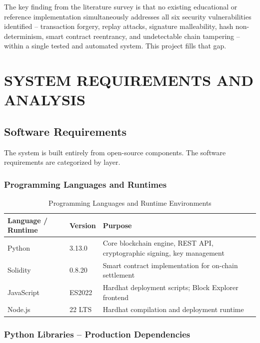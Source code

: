 \documentclass[12pt,a4paper]{report}
\begin{document}
The key finding from the literature survey is that no existing educational or reference
implementation simultaneously addresses all six security vulnerabilities identified --
transaction forgery, replay attacks, signature malleability, hash non-determinism, smart
contract reentrancy, and undetectable chain tampering -- within a single tested and
automated system. This project fills that gap.

\chapter{SYSTEM REQUIREMENTS AND ANALYSIS}

\section{Software Requirements}

The system is built entirely from open-source components. The software requirements are
categorized by layer.

\subsection{Programming Languages and Runtimes}

\begin{table}[H]
\centering
\caption{Programming Languages and Runtime Environments}
\label{tab:languages}
\begin{tabular}{|l|l|p{7cm}|}
\hline
\textbf{Language / Runtime} & \textbf{Version} & \textbf{Purpose} \\
\hline
Python & 3.13.0 & Core blockchain engine, REST API, cryptographic signing, key management \\
\hline
Solidity & 0.8.20 & Smart contract implementation for on-chain settlement \\
\hline
JavaScript & ES2022 & Hardhat deployment scripts; Block Explorer frontend \\
\hline
Node.js & 22 LTS & Hardhat compilation and deployment runtime \\
\hline
\end{tabular}
\end{table}

\subsection{Python Libraries -- Production Dependencies}
\end{document}
